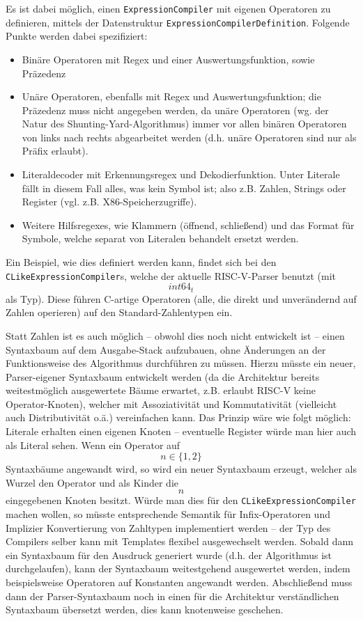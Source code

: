 Es ist dabei möglich, einen \texttt{ExpressionCompiler} mit eigenen Operatoren zu definieren, mittels der Datenstruktur \texttt{ExpressionCompilerDefinition}. Folgende Punkte werden dabei spezifiziert:
\begin{itemize}
\item Binäre Operatoren mit Regex und einer Auswertungsfunktion, sowie Präzedenz
\item Unäre Operatoren, ebenfalls mit Regex und Auswertungsfunktion; die Präzedenz muss nicht angegeben werden, da unäre Operatoren (wg. der Natur des Shunting-Yard-Algorithmus) immer vor allen binären Operatoren von links nach rechts abgearbeitet werden (d.h. unäre Operatoren sind nur als Präfix erlaubt).
\item Literaldecoder mit Erkennungsregex und Dekodierfunktion. Unter Literale fällt in diesem Fall alles, was kein Symbol ist; also z.B. Zahlen, Strings oder Register (vgl. z.B. X86-Speicherzugriffe).
\item Weitere Hilfsregexes, wie Klammern (öffnend, schließend) und das Format für Symbole, welche separat von Literalen behandelt ersetzt werden.
\end{itemize}
Ein Beispiel, wie dies definiert werden kann, findet sich bei den \texttt{CLikeExpressionCompiler}s, welche der aktuelle RISC-V-Parser benutzt (mit $$int64_t$$ als Typ). Diese führen C-artige Operatoren (alle, die direkt und unverändernd auf Zahlen operieren) auf den Standard-Zahlentypen ein.

Statt Zahlen ist es auch möglich – obwohl dies noch nicht entwickelt ist – einen Syntaxbaum auf dem Ausgabe-Stack aufzubauen, ohne Änderungen an der Funktionsweise des Algorithmus durchführen zu müssen. Hierzu müsste ein neuer, Parser-eigener Syntaxbaum entwickelt werden (da die Architektur bereits weitestmöglich ausgewertete Bäume erwartet, z.B. erlaubt RISC-V keine Operator-Knoten), welcher mit Assoziativität und Kommutativität (vielleicht auch Distributivität o.ä.) vereinfachen kann. Das Prinzip wäre wie folgt möglich: Literale erhalten einen eigenen Knoten – eventuelle Register würde man hier auch als Literal sehen. Wenn ein Operator auf $$n\in\{1,2\}$$ Syntaxbäume angewandt wird, so wird ein neuer Syntaxbaum erzeugt, welcher als Wurzel den Operator und als Kinder die $$n$$ eingegebenen Knoten besitzt. Würde man dies für den \texttt{CLikeExpressionCompiler} machen wollen, so müsste entsprechende Semantik für Infix-Operatoren und Implizier Konvertierung von Zahltypen implementiert werden – der Typ des Compilers selber kann mit Templates flexibel ausgewechselt werden. Sobald dann ein Syntaxbaum für den Ausdruck generiert wurde (d.h. der Algorithmus ist durchgelaufen), kann der Syntaxbaum weitestgehend ausgewertet werden, indem beispielsweise Operatoren auf Konstanten angewandt werden. Abschließend muss dann der Parser-Syntaxbaum noch in einen für die Architektur verständlichen Syntaxbaum übersetzt werden, dies kann knotenweise geschehen.

